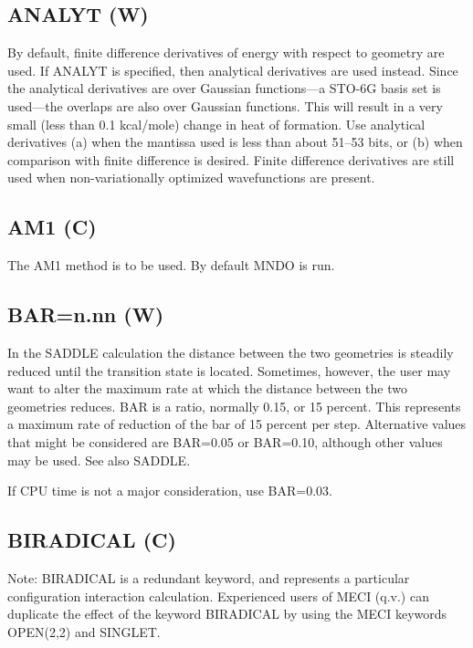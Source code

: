 \documentclass[11pt]{book}
\newcommand{\mi}[1]{#1\index{#1}}
\begin{document}
\subsection*{ANALYT (W)}
      By default, finite difference derivatives of energy with respect  to
 geometry  are  used.  If \mi{ANALYT} is specified, then analytical derivatives
 are used instead.  Since the analytical  derivatives  are  over  Gaussian
 functions---a  STO-6G  basis set is used---the overlaps are also over
 Gaussian functions.  This will result in a  very  small  (less  than  0.1
 kcal/mole)  change  in heat of formation.  Use analytical derivatives (a)
 when the mantissa used is  less  than  about 51--53  bits,  or  (b)  when
 comparison   with   finite  difference  is  desired.   Finite  difference
 derivatives are still used when non-variationally optimized wavefunctions
 are present.


\subsection*{AM1 (C)}
The \mi{AM1} method is to be used.  By default MNDO is run.

\subsection*{BAR=n.nn (W)}
In the SADDLE calculation the distance between the two geometries is
   steadily  reduced  until  the  transition  state  is located.  Sometimes,
   however, the user may want  to  alter  the  maximum  rate  at  which  the
   distance  between  the  two geometries reduces. \mi{BAR} is a ratio, normally
   0.15, or 15 percent.  This represents a maximum rate of reduction of  the
   bar  of 15 percent per step.  Alternative values that might be considered
   are BAR=0.05 or BAR=0.10, although other values may be  used.   See  also
   SADDLE.

   If CPU time is not a major consideration, use BAR=0.03.


                                 
\subsection*{BIRADICAL (C)}
   Note: \mi{BIRADICAL} is a redundant keyword, and represents a particular
   configuration  interaction calculation.  Experienced users of MECI (q.v.)
   can duplicate the effect of the  keyword  BIRADICAL  by  using  the  MECI
   keywords OPEN(2,2) and SINGLET.
\end{document}
